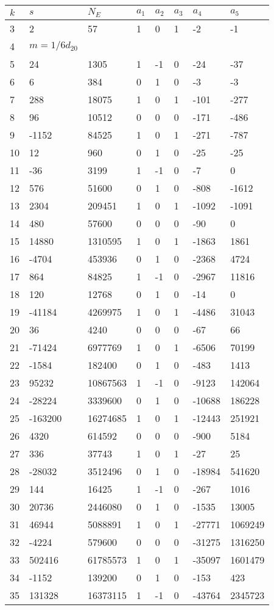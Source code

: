 \documentclass{amsart}
\begin{document}
\begin{longtable}{|l|l|l|lllll|}
\hline
$k$ & $s$ & $N_E$ & $a_1$ & $a_2$ & $a_3$ & $a_4$ & $a_5$\\
\hline
3&2&57&1&0&1&-2&-1\\
4&$m=1/6d_{20}$&&\multicolumn{5}{c|}{}\\
5&24&1305&1&-1&0&-24&-37\\
6&6&384&0&1&0&-3&-3\\
7&288&18075&1&0&1&-101&-277\\
8&96&10512&0&0&0&-171&-486\\
9&-1152&84525&1&0&1&-271&-787\\
10&12&960&0&1&0&-25&-25\\
11&-36&3199&1&-1&0&-7&0\\
12&576&51600&0&1&0&-808&-1612\\
13&2304&209451&1&0&1&-1092&-1091\\
14&480&57600&0&0&0&-90&0\\
15&14880&1310595&1&0&1&-1863&1861\\
16&-4704&453936&0&1&0&-2368&4724\\
17&864&84825&1&-1&0&-2967&11816\\
18&120&12768&0&1&0&-14&0\\
19&-41184&4269975&1&0&1&-4486&31043\\
20&36&4240&0&0&0&-67&66\\
21&-71424&6977769&1&0&1&-6506&70199\\
22&-1584&182400&0&1&0&-483&1413\\
23&95232&10867563&1&-1&0&-9123&142064\\
24&-28224&3339600&0&1&0&-10688&186228\\
25&-163200&16274685&1&0&1&-12443&251921\\
26&4320&614592&0&0&0&-900&5184\\
27&336&37743&1&0&1&-27&25\\
28&-28032&3512496&0&1&0&-18984&541620\\
29&144&16425&1&-1&0&-267&1016\\
30&20736&2446080&0&1&0&-1535&13005\\
31&46944&5088891&1&0&1&-27771&1069249\\
32&-4224&579600&0&0&0&-31275&1316250\\
33&502416&61785573&1&0&1&-35097&1601479\\
34&-1152&139200&0&1&0&-153&423\\
35&131328&16373115&1&-1&0&-43764&2345723\\

\end{longtable}
\end{document}
